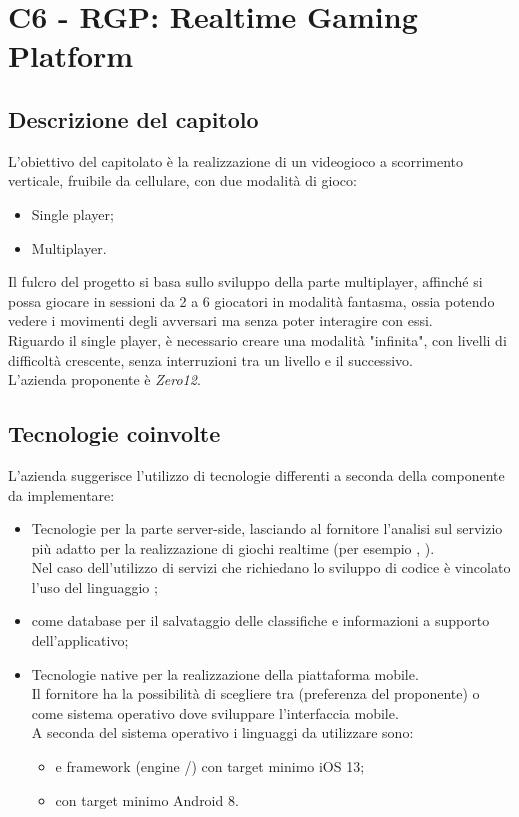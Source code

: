 \section{C6 - RGP: Realtime Gaming Platform}

\subsection{Descrizione del capitolo}
L'obiettivo del capitolato è la realizzazione di un videogioco a scorrimento verticale, fruibile da cellulare, con due modalità di gioco:
\begin{itemize}
\item Single player;
\item Multiplayer.
\end{itemize}  
Il fulcro del progetto si basa sullo sviluppo della parte multiplayer, affinché si possa giocare in sessioni da 2 a 6 giocatori in modalità fantasma, ossia potendo vedere i movimenti degli avversari ma senza poter interagire con essi.\\
Riguardo il single player, è necessario creare una modalità "infinita", con livelli di difficoltà crescente, senza interruzioni tra un livello e il successivo.\\
L'azienda proponente è \textit{Zero12}. 

\subsection{Tecnologie coinvolte}
L'azienda suggerisce l'utilizzo di tecnologie differenti a seconda della componente da implementare:
\begin{itemize}
\item Tecnologie  per la parte server-side, lasciando al fornitore l'analisi sul servizio più adatto per la realizzazione di giochi realtime (per esempio , ). \\
Nel caso dell'utilizzo di servizi che richiedano lo sviluppo di codice è vincolato l'uso del linguaggio ;
\item {} come database  per il salvataggio delle classifiche e informazioni a supporto dell'applicativo; 
\item Tecnologie native per la realizzazione della piattaforma mobile. \\ 
Il fornitore ha la possibilità di scegliere tra  (preferenza del proponente) o  come sistema operativo dove sviluppare l'interfaccia mobile. \\
A seconda del sistema operativo i linguaggi da utilizzare sono:
\begin{itemize}
\item {} e framework  (engine /) con target minimo iOS 13;
\item {} con target minimo Android 8.
\end{itemize}
\end{itemize}

